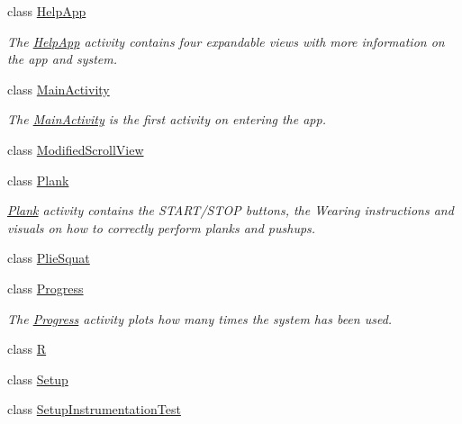 \begin{DoxyCompactItemize}
class \mbox{\hyperlink{classcom_1_1example_1_1trainawearapplication_1_1_help_app}{Help\+App}}
\begin{DoxyCompactList}\small\item\em The \mbox{\hyperlink{classcom_1_1example_1_1trainawearapplication_1_1_help_app}{Help\+App}} activity contains four expandable views with more information on the app and system. \end{DoxyCompactList}\item 
class \mbox{\hyperlink{classcom_1_1example_1_1trainawearapplication_1_1_main_activity}{Main\+Activity}}
\begin{DoxyCompactList}\small\item\em The \mbox{\hyperlink{classcom_1_1example_1_1trainawearapplication_1_1_main_activity}{Main\+Activity}} is the first activity on entering the app. \end{DoxyCompactList}\item 
class \mbox{\hyperlink{classcom_1_1example_1_1trainawearapplication_1_1_modified_scroll_view}{Modified\+Scroll\+View}}
\item 
class \mbox{\hyperlink{classcom_1_1example_1_1trainawearapplication_1_1_plank}{Plank}}
\begin{DoxyCompactList}\small\item\em \mbox{\hyperlink{classcom_1_1example_1_1trainawearapplication_1_1_plank}{Plank}} activity contains the S\+T\+A\+R\+T/\+S\+T\+OP buttons, the Wearing instructions and visuals on how to correctly perform planks and pushups. \end{DoxyCompactList}\item 
class \mbox{\hyperlink{classcom_1_1example_1_1trainawearapplication_1_1_plie_squat}{Plie\+Squat}}
\item 
class \mbox{\hyperlink{classcom_1_1example_1_1trainawearapplication_1_1_progress}{Progress}}
\begin{DoxyCompactList}\small\item\em The \mbox{\hyperlink{classcom_1_1example_1_1trainawearapplication_1_1_progress}{Progress}} activity plots how many times the system has been used. \end{DoxyCompactList}\item 
class \mbox{\hyperlink{classcom_1_1example_1_1trainawearapplication_1_1_r}{R}}
\item 
class \mbox{\hyperlink{classcom_1_1example_1_1trainawearapplication_1_1_setup}{Setup}}
\item 
class \mbox{\hyperlink{classcom_1_1example_1_1trainawearapplication_1_1_setup_instrumentation_test}{Setup\+Instrumentation\+Test}}

\end{DoxyCompactItemize}
